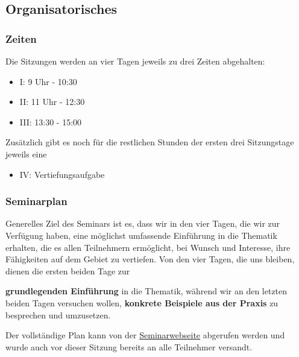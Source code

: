 
\subsection{\texorpdfstring{{Organisatorisches}}{Organisatorisches}}

\subsubsection{\texorpdfstring{{Zeiten}}{Zeiten}}

Die Sitzungen werden an vier Tagen jeweils zu drei Zeiten abgehalten:

\begin{itemize}
\itemsep1pt\parskip0pt
\item
  I: 9 Uhr - 10:30
\item
  II: 11 Uhr - 12:30
\item
  III: 13:30 - 15:00
\end{itemize}

Zusätzlich gibt es noch für die restlichen Stunden der ersten drei
Sitzungstage jeweils eine

\begin{itemize}
\itemsep1pt\parskip0pt
\item
  IV: Vertiefungsaufgabe
\end{itemize}

\subsubsection{\texorpdfstring{{Seminarplan}}{Seminarplan}}

Generelles Ziel des Seminars ist es, dass wir in den vier Tagen, die wir
zur Verfügung haben, eine möglichst umfassende Einführung in die
Thematik erhalten, die es allen Teilnehmern ermöglicht, bei Wunsch und
Interesse, ihre Fähigkeiten auf dem Gebiet zu vertiefen. Von den vier
Tagen, die uns bleiben, dienen die ersten beiden Tage zur
\vspace{0.5cm}\par\noindent\textbf{grundlegenden Einführung} in die Thematik, während wir an den\vspace{0.5cm}
letzten beiden Tagen versuchen wollen, \textbf{konkrete Beispiele aus
der Praxis} zu besprechen und umzusetzen.

Der vollständige Plan kann von der
\href{http://lingulist.de/pyjs/seminarplan.html}{Seminarwebseite}
abgerufen werden und wurde auch vor dieser Sitzung bereits an alle
Teilnehmer versandt.


